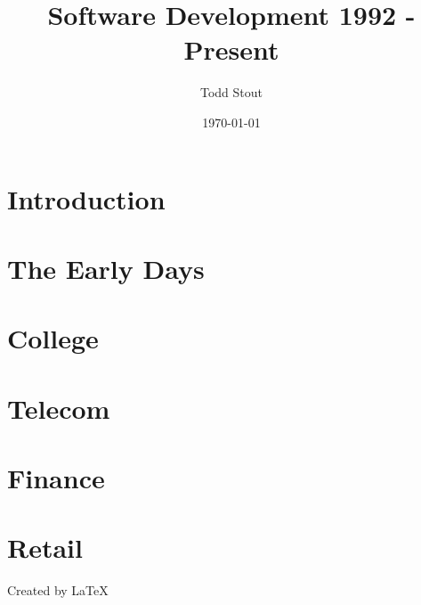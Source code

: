 \documentclass[12pt]{book}
\begin{document}
\title{Software Development 1992 - Present}
\author{Todd Stout}
\date{\today}

\maketitle


\tableofcontents

\chapter{Introduction}


\chapter{The Early Days}


\chapter{College}


\chapter{Telecom}


\chapter{Finance}


\chapter{Retail}


Created by \LaTeX\
	
\end{document}
